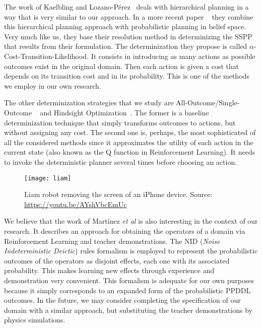 \documentclass[../root.tex]{subfiles}
\begin{document}
The work of Kaelbling and Lozano-Pérez~%
\cite{kaelbling2011hierarchical} deals with hierarchical planning in
a way that is very similar to our approach. In a more recent paper%
~\cite{kaelbling2013integrated} they combine this hierarchical planning
approach with probabilistic planning in belief space. Very much like us,
they base their resolution method in determinizing the SSPP that results
from their formulation. The determinization they propose is called
$ \alpha $-Cost-Transition-Likelihood. It consists in introducing as many
actions as possible outcomes exist in the original domain. Then each
action is given a cost that depends on its transition cost and in its
probability. This is one of the methods we employ in our
own research.

The other determinization strategies that we study are All-Outcome/Single-Outcome%
~\cite{yoon2007ffreplan} and Hindsight Optimization~\cite{yoon2008probabilistic,yoon2010improving}.
The former is a baseline determinization technique that simply transforms outcomes
to actions, but without assigning any cost. The second one is, perhaps, the most
sophisticated of all the considered methods since it approximates the
utility of each action in the current state (also known as the Q function in
Reinforcement Learning). It needs to invoke the deterministic planner several times
before choosing an action.

\begin{wrapfigure}{L}{0.5\columnwidth}
	\centering
	\texttt{[image: liam]}
	\caption{Liam robot removing the screen of an iPhone device.
		Source: \url{https://youtu.be/AYshVbcEmUc}}
	\label{fig:liam}
\end{wrapfigure}

We believe that the work of Martínez \textit{et al} is also interesting in the
context of our research. It describes an approach for obtaining the operators
of a domain via Reinforcement Learning and teacher demonstrations. The
NID (\emph{Noise Indeterministic Deictic}) rules formalism is employed to
represent the probabilistic outcomes of the operators as disjoint effects,
each one with its associated probability. This makes learning
new effects through experience and demonstration very convenient.
This formalism is adequate for our own purposes because it simply corresponds
to an expanded form of the probabilistic PPDDL outcomes. In the future, we
may consider completing the specification of our domain with a similar
approach, but substituting the teacher demonstrations by physics simulations.
\end{document}
